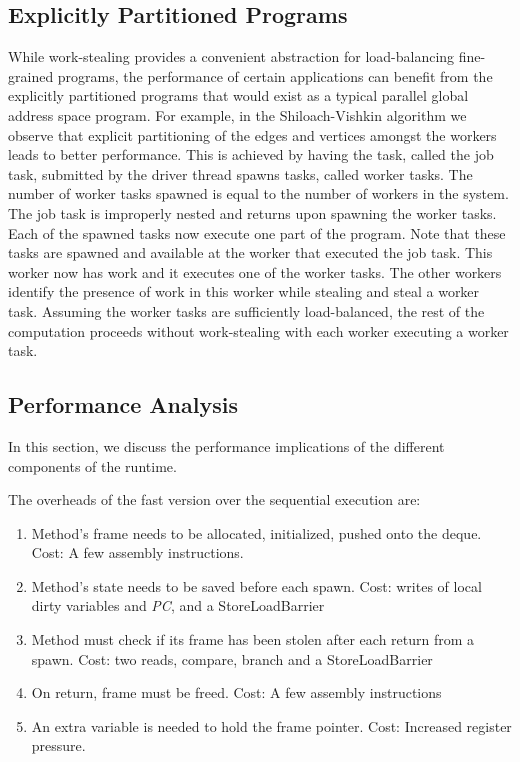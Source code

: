 \subsection{Explicitly Partitioned Programs}

While work-stealing provides a convenient abstraction for
load-balancing fine-grained programs, the performance of certain
applications can benefit from the explicitly partitioned programs that
would exist as a typical parallel global address space program. For
example, in the Shiloach-Vishkin algorithm we observe that explicit
partitioning of the edges and vertices amongst the workers leads to
better performance. This is achieved by having the task, called the
job task, submitted by the driver thread spawns tasks, called worker
tasks. The number of worker tasks spawned is equal to the number of
workers in the system. The job task is improperly nested and returns
upon spawning the worker tasks. Each of the spawned tasks now execute
one part of the program. Note that these tasks are spawned and
available at the worker that executed the job task. This worker now
has work and it executes one of the worker tasks. The other workers
identify the presence of work in this worker while stealing and steal
a worker task. Assuming the worker tasks are sufficiently
load-balanced, the rest of the computation proceeds without
work-stealing with each worker executing a worker task. 

\subsection{Performance Analysis}

In this section, we discuss the performance implications of the
different components of the runtime. 

The overheads of the fast version over the sequential execution are:

\begin{enumerate}
\item Method's frame needs to be allocated, initialized, pushed onto
  the deque. Cost: A few assembly instructions.
\item Method's state needs to be saved before each spawn. Cost: writes
  of local dirty variables and {\em PC}, and a {\java
  StoreLoadBarrier}
\item Method must check if its frame has been stolen after each
  return from a spawn. Cost: two reads, compare, branch and a 
  {\java StoreLoadBarrier} 
\item On return, frame must be freed. Cost: A few assembly instructions
\item An extra variable is needed to hold the frame pointer. Cost: Increased
  register pressure.
\end{enumerate}

